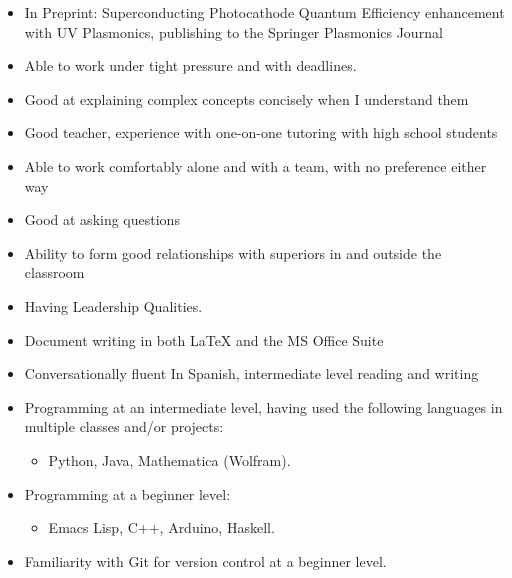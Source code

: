 



\smallskip
\begin{itemize}
\item In Preprint: Superconducting Photocathode Quantum Efficiency enhancement with UV Plasmonics, publishing to the Springer Plasmonics Journal
\end{itemize}

\smallskip
\begin{itemize}
\item Able to work under tight pressure and with deadlines.
\smallskip
\item Good at explaining complex concepts concisely when I understand them
\smallskip
\item Good teacher, experience with one-on-one tutoring with high school students
\smallskip
\item Able to work comfortably alone and with a team, with no preference either way
\smallskip
\item Good at asking questions
\smallskip
\item Ability to form good relationships with superiors in and outside the classroom
\smallskip
\item Having Leadership Qualities.
\end{itemize}

\smallskip
\begin{itemize}
\item Document writing in both LaTeX and the MS Office Suite
\item Conversationally fluent In Spanish, intermediate level reading and writing
\item Programming at an intermediate level, having used the following languages in multiple classes and/or projects: 
\begin{itemize} \item Python, Java, Mathematica (Wolfram). \end{itemize}
\item Programming at a beginner level: 
\begin{itemize} \item Emacs Lisp, C++, Arduino, Haskell. \end{itemize}
\item Familiarity with Git for version control at a beginner level.
\end{itemize}

\cvproject{}